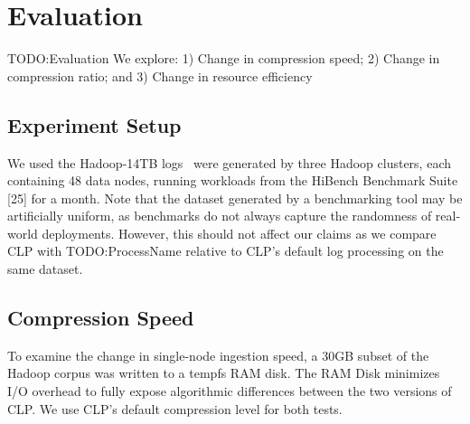 \documentclass[letterpaper,twocolumn,10pt]{article}
\begin{document}
\section{Evaluation}
TODO:Evaluation
We explore: 1) Change in compression speed; 2) Change in compression ratio; and 3) Change in resource efficiency

\subsection{Experiment Setup}
We used the Hadoop-14TB logs~\cite{hadoop14tbdataset} were generated by three Hadoop clusters, each containing 48 data nodes, running workloads from the HiBench Benchmark Suite [25] for a month. Note that the dataset generated by a benchmarking tool may be artificially uniform, as benchmarks do not always capture the randomness of real-world deployments. However, this should not affect our claims as we compare CLP with TODO:ProcessName relative to CLP's default log processing on the same dataset.


\subsection{Compression Speed}

To examine the change in single-node ingestion speed, a 30GB subset of the Hadoop corpus was written to a tempfs RAM disk. The RAM Disk minimizes I/O overhead to fully expose algorithmic differences between the two versions of CLP. We use CLP's default compression level for both tests.
\end{document}
